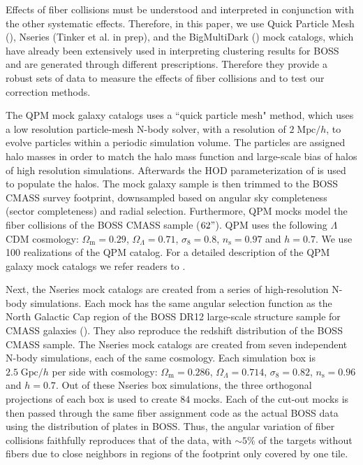 Effects of fiber collisions must be understood and interpreted in conjunction 
with the other systematic effects. Therefore, in this paper, we use Quick 
Particle Mesh (\citealt{White:2014aa}), Nseries (Tinker et al. in prep), and 
the BigMultiDark (\citealt{Rodriguez-Torres:2015aa}) mock catalogs, which 
have already been extensively used in interpreting clustering results for  
BOSS and are generated through different prescriptions. Therefore they 
provide a robust sets of data to measure the effects of fiber collisions and 
to test our correction methods. 

The QPM mock galaxy catalogs uses a ``quick particle mesh" method, which uses 
a low resolution particle-mesh N-body solver, with a resolution of 
$2\;\mathrm{Mpc}/h$, to evolve particles within a 
periodic simulation volume. The particles are assigned halo masses in order 
to match the halo mass function and large-scale bias of halos of high resolution 
simulations. Afterwards the HOD parameterization of \cite{Tinker:2012aa} is 
used to populate the halos. The mock galaxy sample is then trimmed to the 
BOSS CMASS survey footprint, downsampled based on angular sky completeness 
(sector completeness) and radial selection. Furthermore, QPM mocks model the 
fiber collisions of the BOSS CMASS sample ($62"$). QPM uses the following 
$\Lambda$CDM cosmology: $\Omega_\mathrm{m} = 0.29$, $\Omega_\Lambda = 0.71$, 
$\sigma_8 = 0.8$, $n_\mathrm{s} = 0.97$ and $h=0.7$. We use 100 realizations 
of the QPM catalog. For a detailed description of the QPM galaxy mock catalogs 
we refer readers to \cite{White:2014aa}. 

Next, the Nseries mock catalogs are created from a series of high-resolution 
N-body simulations. Each mock has the same angular selection function as the 
North Galactic Cap region of the BOSS DR12 large-scale structure sample for 
CMASS galaxies (\citealt{Cuesta:2016aa}). They also reproduce the 
redshift distribution of the BOSS CMASS sample. The Nseries mock catalogs are 
created from seven independent N-body simulations, each of the same cosmology. 
Each simulation box is $2.5\;\mathrm{Gpc}/h$ per side with cosmology: 
$\Omega_\mathrm{m} = 0.286$, $\Omega_\Lambda = 0.714$, $\sigma_8 = 0.82$,
$n_\mathrm{s} = 0.96$ and $h=0.7$. Out of these Nseries box simulations, the 
three orthogonal projections of each box is used to create $84$ mocks.
Each of the cut-out mocks is then passed through the same fiber assignment 
code as the actual BOSS data using the distribution of plates in BOSS. 
Thus, the angular variation of fiber collisions faithfully reproduces 
that of the data, with $\sim 5\%$ of the targets without fibers due to close 
neighbors in regions of the footprint only covered by one tile. 

